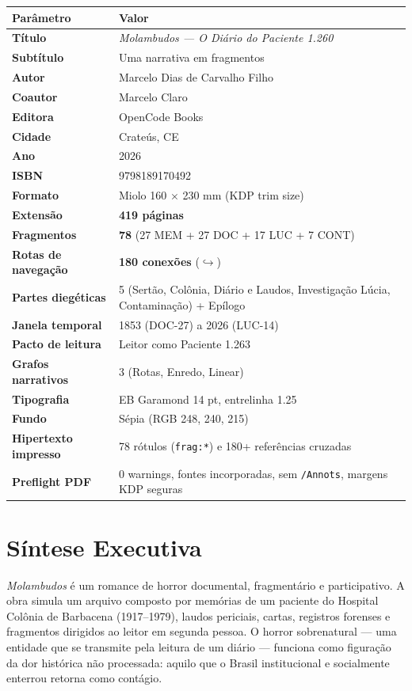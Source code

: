\documentclass[14pt,openany]{extbook}
\begin{document}
\begin{longtable}{>{\bfseries}p{}p{}}
\toprule
\textbf{Parâmetro} & \textbf{Valor} \\
\midrule
\endhead
Título & \textit{Molambudos --- O Diário do Paciente 1.260} \\
Subtítulo & Uma narrativa em fragmentos \\
Autor & Marcelo Dias de Carvalho Filho \\
Coautor & Marcelo Claro \\
Editora & OpenCode Books \\
Cidade & Crateús, CE \\
Ano & 2026 \\
ISBN & 9798189170492 \\
Formato & Miolo 160 $\times$ 230 mm (KDP trim size) \\
Extensão & \textbf{419 páginas} \\
Fragmentos & \textbf{78} (27 MEM + 27 DOC + 17 LUC + 7 CONT) \\
Rotas de navegação & \textbf{180 conexões} ($\hookrightarrow$) \\
Partes diegéticas & 5 (Sertão, Colônia, Diário e Laudos, Investigação Lúcia, Contaminação) + Epílogo \\
Janela temporal & 1853 (DOC-27) a 2026 (LUC-14) \\
Pacto de leitura & Leitor como Paciente 1.263 \\
Grafos narrativos & 3 (Rotas, Enredo, Linear) \\
Tipografia & EB Garamond 14 pt, entrelinha 1.25 \\
Fundo & Sépia (RGB 248, 240, 215) \\
Hipertexto impresso & 78 rótulos (\texttt{frag:*}) e 180+ referências cruzadas \\
Preflight PDF & 0 warnings, fontes incorporadas, sem \texttt{/Annots}, margens KDP seguras \\
\bottomrule
\end{longtable}

\section*{Síntese Executiva}

\textit{Molambudos} é um romance de horror documental, fragmentário e participativo. A obra simula um arquivo composto por memórias de um paciente do Hospital Colônia de Barbacena (1917--1979), laudos periciais, cartas, registros forenses e fragmentos dirigidos ao leitor em segunda pessoa. O horror sobrenatural --- uma entidade que se transmite pela leitura de um diário --- funciona como figuração da dor histórica não processada: aquilo que o Brasil institucional e socialmente enterrou retorna como contágio.
\end{document}
